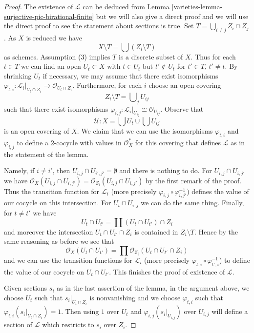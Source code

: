 \begin{proof}

The existence of $\mathcal{L}$ can be deduced from
Lemma \ref{varieties-lemma-surjective-pic-birational-finite}
but we will also give a direct proof and we will use
the direct proof to see the statement about sections is true.
Set $T = \bigcup_{i \not = j} Z_i \cap Z_j$. As $X$ is reduced we have
$$
X \setminus T = \bigcup (Z_i \setminus T)
$$
as schemes. Assumption (3) implies $T$ is a discrete subset of $X$.
Thus for each $t \in T$ we can find an open $U_t \subset X$
with $t \in U_t$ but $t' \not \in U_t$ for $t' \in T$, $t' \not = t$.
By shrinking $U_t$ if necessary, we may assume that there exist isomorphisms
$\varphi_{t, i} : \mathcal{L}_i|_{U_t \cap Z_i} \to
\mathcal{O}_{U_t \cap Z_i}$. Furthermore, for each $i$ choose an open covering
$$
Z_i \setminus T = \bigcup\nolimits_j U_{ij}
$$
such that there exist isomorphisms
$\varphi_{i, j} : \mathcal{L}_i|_{U_{ij}} \cong \mathcal{O}_{U_{ij}}$.
Observe that
$$
\mathcal{U} : X = \bigcup U_t \cup \bigcup U_{ij}
$$
is an open covering of $X$. We claim that we can use the isomorphisms
$\varphi_{t, i}$ and $\varphi_{i, j}$ to define a $2$-cocycle with values
in $\mathcal{O}_X^*$ for this covering that defines $\mathcal{L}$ as
in the statement of the lemma.

\medskip\noindent
Namely, if $i \not = i'$, then $U_{i, j} \cap U_{i', j'} = \emptyset$
and there is nothing to do. For $U_{i, j} \cap U_{i, j'}$ we have
$\mathcal{O}_X(U_{i, j} \cap U_{i, j'}) =
\mathcal{O}_{Z_i}(U_{i, j} \cap U_{i, j'})$ by the first remark of the proof.
Thus the transition function for $\mathcal{L}_i$ (more precisely
$\varphi_{i, j} \circ \varphi_{i, j'}^{-1}$) defines the value of our
cocycle on this intersection.
For $U_t \cap U_{i, j}$ we can do the same thing.
Finally, for $t \not = t'$ we have
$$
U_t \cap U_{t'} = \coprod (U_t \cap U_{t'}) \cap Z_i
$$
and moreover the intersection $U_t \cap U_{t'} \cap Z_i$ is contained
in $Z_i \setminus T$. Hence by the same reasoning as before we see that
$$
\mathcal{O}_X(U_t \cap U_{t'}) =
\prod \mathcal{O}_{Z_i}(U_t \cap U_{t'} \cap Z_i)
$$
and we can use the transition functions for $\mathcal{L}_i$ (more precisely
$\varphi_{t, i} \circ \varphi_{t', i}^{-1}$) to define the value of
our cocycle on $U_t \cap U_{t'}$. This finishes the proof of existence
of $\mathcal{L}$.

\medskip\noindent
Given sections $s_i$ as in the last assertion of the lemma, in the argument
above, we choose $U_t$ such that $s_i|_{U_t \cap Z_i}$ is nonvanishing and
we choose $\varphi_{t, i}$ such that $\varphi_{t, i}(s_i|_{U_t \cap Z_i}) = 1$.
Then using $1$ over $U_t$ and $\varphi_{i, j}(s_i|_{U_{i, j}})$ over
$U_{i, j}$ will define a section of $\mathcal{L}$ which restricts
to $s_i$ over $Z_i$.
\end{proof}

